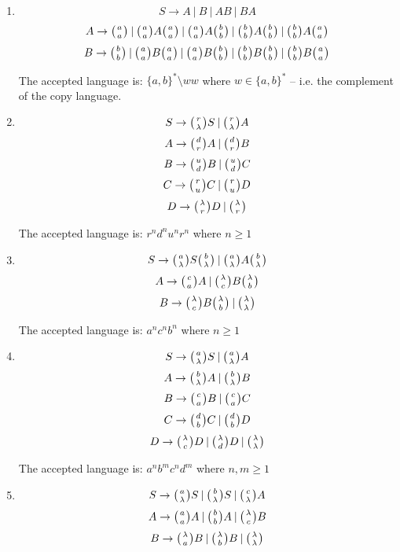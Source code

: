 \begin{enumerate}
  \item{
    $$S \rightarrow A \:|\: B \:|\: A B \:|\: B A$$
    $$A \rightarrow \wkpair{a}{a} \:|\: \wkpair{a}{a} A \wkpair{a}{a} \:|\: \wkpair{a}{a} A \wkpair{b}{b} \:|\: \wkpair{b}{b} A \wkpair{b}{b} \:|\: \wkpair{b}{b} A \wkpair{a}{a}$$
    $$B \rightarrow \wkpair{b}{b} \:|\: \wkpair{a}{a} B \wkpair{a}{a} \:|\: \wkpair{a}{a} B \wkpair{b}{b} \:|\: \wkpair{b}{b} B \wkpair{b}{b} \:|\: \wkpair{b}{b} B \wkpair{a}{a}$$

    The accepted language is: $\{a, b\}^* \setminus ww$ where $w \in \{a, b\}^*$ -- i.e. the complement of the copy language.
  }

  \item{
    $$S \rightarrow \wkpair{r}{\lambda} S \:|\: \wkpair{r}{\lambda} A$$
    $$A \rightarrow \wkpair{d}{r} A \:|\: \wkpair{d}{r} B$$
    $$B \rightarrow \wkpair{u}{d} B \:|\: \wkpair{u}{d} C$$
    $$C \rightarrow \wkpair{r}{u} C \:|\: \wkpair{r}{u} D$$
    $$D \rightarrow \wkpair{\lambda}{r} D \:|\: \wkpair{\lambda}{r}$$

    The accepted language is: $r^nd^nu^nr^n$ where $n \geq 1$
  }

  \item{
    $$S \rightarrow \wkpair{a}{\lambda} S \wkpair{b}{\lambda} \:|\: \wkpair{a}{\lambda} A \wkpair{b}{\lambda}$$
    $$A \rightarrow \wkpair{c}{a} A \:|\: \wkpair{\lambda}{c} B \wkpair{\lambda}{b}$$
    $$B \rightarrow \wkpair{\lambda}{c} B \wkpair{\lambda}{b} \:|\: \wkpair{\lambda}{\lambda}$$

    The accepted language is: $a^nc^nb^n$ where $n \geq 1$
  }

  \item{
    $$S \rightarrow \wkpair{a}{\lambda} S \:|\: \wkpair{a}{\lambda} A$$
    $$A \rightarrow \wkpair{b}{\lambda} A \:|\: \wkpair{b}{\lambda} B$$
    $$B \rightarrow \wkpair{c}{a} B \:|\: \wkpair{c}{a} C$$
    $$C \rightarrow \wkpair{d}{b} C \:|\: \wkpair{d}{b} D$$
    $$D \rightarrow \wkpair{\lambda}{c} D \:|\: \wkpair{\lambda}{d} D \:|\: \wkpair{\lambda}{\lambda}$$

    The accepted language is: $a^nb^mc^nd^m$ where $n, m \geq 1$
  }

  \item{
    $$S \rightarrow \wkpair{a}{\lambda} S \:|\: \wkpair{b}{\lambda} S \:|\: \wkpair{c}{\lambda} A$$
    $$A \rightarrow \wkpair{a}{a} A \:|\: \wkpair{b}{b} A \:|\: \wkpair{\lambda}{c} B$$
    $$B \rightarrow \wkpair{\lambda}{a} B \:|\: \wkpair{\lambda}{b} B \:|\: \wkpair{\lambda}{\lambda}$$

}
\end{enumerate}
